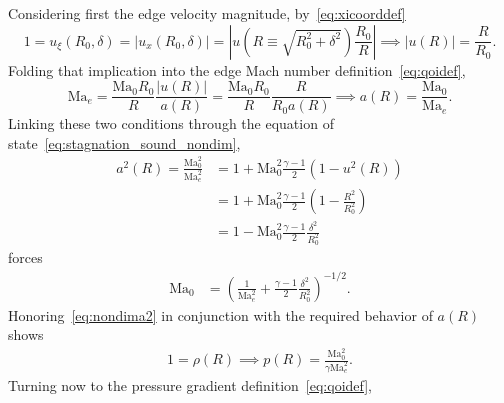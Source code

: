 \documentclass[letterpaper,11pt,nointlimits,reqno]{amsart}
\newcommand{\Mach}[1][]{\mbox{Ma}_{#1}}
\begin{document}
Considering first the edge velocity magnitude, by~\eqref{eq:xicoorddef}
\begin{equation}
    1
    = u_\xi\!\left(R_0, \delta\right)
    = \left|u_x\!\left(R_0,\delta\right) \right|
    = \left|u  \!\left(R\equiv\sqrt{R_0^2+\delta^2}\right) \frac{R_0}{R} \right|
\implies
    \left|u\!\left(R\right)\right| = \frac{R}{R_0}
    \label{eq:matching_u}
.
\end{equation}
%
Folding that implication into the edge Mach number
definition~\eqref{eq:qoidef},
\begin{equation}
    \Mach[e]{}
    =
    \frac{\Mach[0]{} R_0}{R}
    \frac{\left|u\!\left(R\right)\right|}
         {      a\!\left(R\right)       }
    =
    \frac{\Mach[0]{} R_0}{R}
    \frac{R}{R_0 a\!\left(R\right)}
\implies
    a\!\left( R \right) = \frac{\Mach[0]}{\Mach[e]}
.
\end{equation}
%
Linking these two conditions through the equation of
state~\eqref{eq:stagnation_sound_nondim},
\begin{align}
    a^2\!\left(R\right)
    = \frac{\Mach[0]^2}{\Mach[e]^2}
   &= 1 + \Mach[0]^2\frac{\gamma-1}{2}\left(1-u^2\!\left(R\right)\right)
\\ &= 1 + \Mach[0]^2\frac{\gamma-1}{2}\left(1-\frac{R^2}{R_0^2}\right)
\\ &= 1 - \Mach[0]^2\frac{\gamma-1}{2}\frac{\delta^2}{R_0^2}
\end{align}
forces
\begin{align}
    \Mach[0] &= \left(
            \frac{1}{\Mach[e]^2} + \frac{\gamma-1}{2}\frac{\delta^2}{R_0^2}
    \right)^{-1/2}
    \label{eq:matching_Ma0}
.
\end{align}
Honoring~\eqref{eq:nondima2} in conjunction with the required behavior of
$a\!\left(R\right)$ shows
\begin{align}
    1 = \rho\!\left(R\right)
    \implies
    p\!\left(R\right) = \frac{\Mach[0]^2}{\gamma \Mach[e]^2}.
    \label{eq:matching_p}
\end{align}
Turning now to the pressure gradient definition~\eqref{eq:qoidef},
\end{document}
